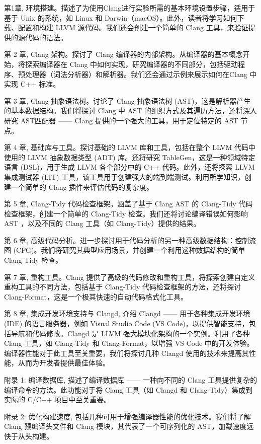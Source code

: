 
第1章, 环境搭建。描述了为使用Clang进行实验所需的基本环境设置步骤，适用于基于 Unix 的系统，如 Linux 和 Darwin（macOS）。此外，读者将学习如何下载、配置和构建 LLVM 源代码。我们还会创建一个简单的 Clang 工具，来验证提供的源代码的语法。

第 2 章, Clang 架构。探讨了 Clang 编译器的内部架构。从编译器的基本概念开始，将探索编译器在 Clang 中如何实现，研究编译器的不同部分，包括驱动程序、预处理器（词法分析器）和解析器。我们还会通过示例来展示如何在Clang 中实现 C++ 标准。

第 3 章, Clang 抽象语法树。讨论了 Clang 抽象语法树 (AST)，这是解析器产生的基本数据结构。我们将探讨 Clang 中 AST 的组织方式及其遍历方法，还将深入研究 AST匹配器 —— Clang 提供的一个强大的工具，用于定位特定的 AST 节点。

第 4 章, 基础库与工具。探讨基础的 LLVM 库和工具，包括在整个 LLVM 代码中使用的 LLVM 抽象数据类型 (ADT) 库。还将研究 TableGen，这是一种领域特定语言 (DSL)，用于生成 LLVM 各个部分中的 C++ 代码。此外，还将探索 LLVM 集成测试器 (LIT) 工具，该工具用于创建强大的端到端测试。利用所学知识，创建一个简单的 Clang 插件来评估代码的复杂度。

第 5 章, Clang-Tidy 代码检查框架。涵盖了基于 Clang AST 的 Clang-Tidy 代码检查框架，创建一个简单的 Clang-Tidy 检查。我们还将讨论编译错误如何影响 AST ，以及不同的 Clang 工具（如 Clang-Tidy）提供的结果。

第 6 章, 高级代码分析。进一步探讨用于代码分析的另一种高级数据结构：控制流图 (CFG)。我们将研究其典型应用场景，并创建一个利用这种数据结构的简单 Clang-Tidy 检查。

第 7 章, 重构工具。Clang 提供了高级的代码修改和重构工具，将探索创建自定义重构工具的不同方法，包括基于 Clang-Tidy 代码检查框架的方法，还将探讨 Clang-Format，这是一个极其快速的自动代码格式化工具。

第 8 章, 集成开发环境支持与 Clangd, 介绍 Clangd —— 用于各种集成开发环境 (IDE) 的语言服务器，例如 Visual Studio Code (VS Code)，以提供智能支持，包括导航和代码修改。Clangd 是 LLVM 强大模块化架构的一个实例。利用了各种 Clang 工具，如 Clang-Tidy 和 Clang-Format，以增强 VS Code 中的开发体验。编译器性能对于此工具至关重要，我们将探讨几种 Clangd 使用的技术来提高其性能，从而为开发者提供最佳体验。

附录 1: 编译数据库, 描述了编译数据库 —— 一种向不同的 Clang 工具提供复杂的编译命令的方法。此功能对于将 Clang 工具（如 Clangd 和 Clang-Tidy）集成到实际的 C/C++ 项目中至关重要。

附录 2: 优化构建速度, 包括几种可用于增强编译器性能的优化技术。我们将了解 Clang 预编译头文件和 Clang 模块，其代表了一个可序列化的 AST，加载速度远快于从头构建。

